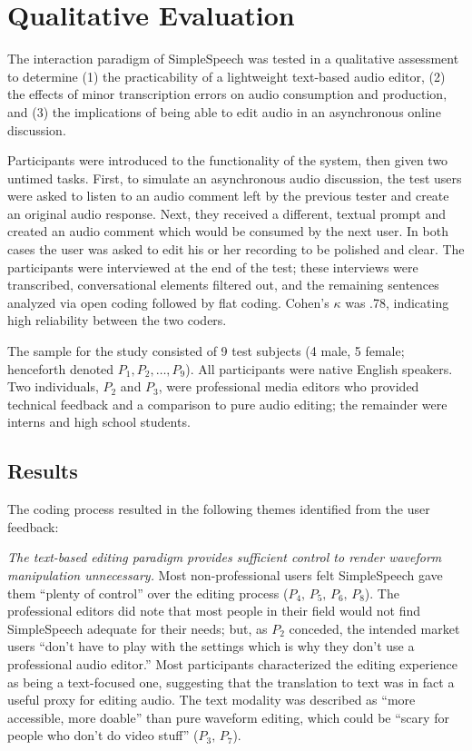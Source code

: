 \section{Qualitative Evaluation}

The interaction paradigm of SimpleSpeech was tested in a qualitative assessment to determine (1) the practicability of a lightweight text-based audio editor, (2) the effects of minor transcription errors on audio consumption and production, and (3) the implications of being able to edit audio in an asynchronous online discussion.

Participants were introduced to the functionality of the system, then given two untimed tasks. 
First, to simulate an asynchronous audio discussion, the test users were asked to listen to an audio comment left by the previous tester and create an original audio response. 
Next, they received a different, textual prompt and created an audio comment which would be consumed by the next user. 
In both cases the user was asked to edit his or her recording to be polished and clear.
The participants were interviewed at the end of the test; these interviews were transcribed, conversational elements filtered out, and the remaining sentences analyzed via open coding followed by flat coding. Cohen's $\kappa$ was .78, indicating high reliability between the two coders.

The sample for the study consisted of 9 test subjects (4 male, 5 female; henceforth denoted $P_1, P_2, \ldots, P_9$). 
All participants were native English speakers. 
Two individuals, $P_2$ and $P_3$, were professional media editors who provided technical feedback and a comparison to pure audio editing; the remainder were interns and high school students.

\subsection{Results}
The coding process resulted in the following themes identified from the user feedback:

\emph{The text-based editing paradigm provides sufficient control to render waveform manipulation unnecessary.}
Most non-professional users felt SimpleSpeech gave them ``plenty of control'' over the editing process ($P_4,\,P_5,\,P_6,\,P_8$). 
The professional editors did note that most people in their field would not find SimpleSpeech adequate for their needs; but, as $P_2$ conceded, the intended market users ``don't have to play with the settings which is why they don't use a professional audio editor.''
Most participants characterized the editing experience as being a text-focused one, suggesting that the translation to text was in fact a useful proxy for editing audio. 
The text modality was described as ``more accessible, more doable'' than pure waveform editing, which could be ``scary for people who don't do video stuff'' ($P_3,\,P_7$). 

